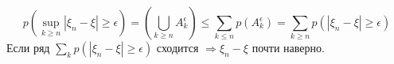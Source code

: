 \begin{corollary}
$$p\left(\sup\limits_{k\geqslant n} |\xi_{n}-\xi|\geqslant \epsilon\right) = \left(\bigcup\limits_{k\geqslant n} A_{k}^{\epsilon}\right)\leqslant
 \sum\limits_{k\leqslant n}p(A_{k}^{\epsilon})=\sum\limits_{k\geqslant n} p(|\xi_{n}-\xi|\geqslant \epsilon)$$
 Если ряд $\sum\limits_{k} p(|\xi_{n}-\xi|\geqslant \epsilon) $
  сходится $\Rightarrow \xi_{n}-\xi$ почти наверно.
\end{corollary}
